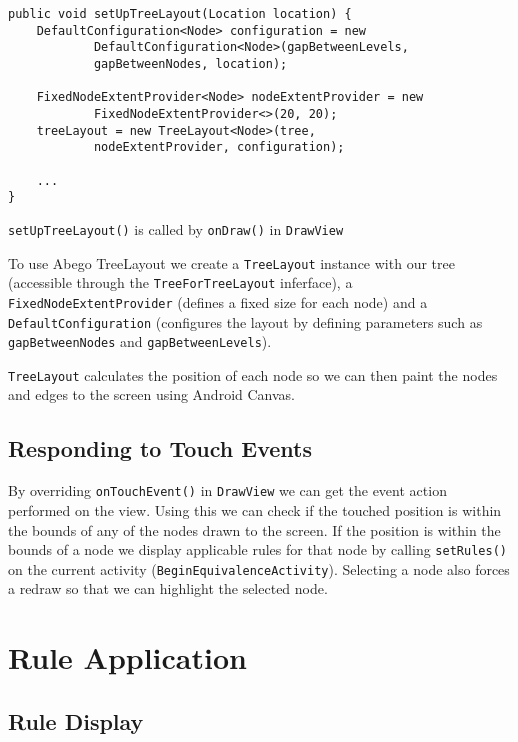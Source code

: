 \documentclass[draft]{report}
\begin{document}
\begin{listing}[ht!]
\begin{verbatim}
public void setUpTreeLayout(Location location) {
    DefaultConfiguration<Node> configuration = new 
            DefaultConfiguration<Node>(gapBetweenLevels, 
            gapBetweenNodes, location);

    FixedNodeExtentProvider<Node> nodeExtentProvider = new 
            FixedNodeExtentProvider<>(20, 20);
    treeLayout = new TreeLayout<Node>(tree,
            nodeExtentProvider, configuration);

    ...
}
\end{verbatim}
\caption{{\tt setUpTreeLayout()} is called by {\tt onDraw()} in {\tt DrawView}}
\label{setuptreelayout}
\end{listing}

To use Abego TreeLayout we create a {\tt TreeLayout} instance with our tree (accessible through the {\tt TreeForTreeLayout} inferface), a {\tt FixedNodeExtentProvider} (defines a fixed size for each node) and a {\tt DefaultConfiguration} (configures the layout by defining parameters such as {\tt gapBetweenNodes} and {\tt gapBetweenLevels}).

{\tt TreeLayout} calculates the position of each node so we can then paint the nodes and edges to the screen using Android Canvas.

\subsection{Responding to Touch Events}

By overriding {\tt onTouchEvent()} in {\tt DrawView} we can get the event action performed on the view. Using this we can check if the touched position is within the bounds of any of the nodes drawn to the screen. If the position is within the bounds of a node we display applicable rules for that node by calling {\tt setRules()} on the current activity ({\tt BeginEquivalenceActivity}). Selecting a node also forces a redraw so that we can highlight the selected node.

\section{Rule Application}

\subsection{Rule Display}
\end{document}
